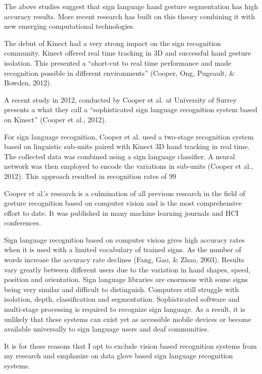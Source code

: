 The above studies suggest that sign language hand gesture segmentation has high accuracy results. More recent research has built on this theory combining it with new emerging computational technologies. 

The debut of Kinect had a very strong impact on the sign recognition community. Kinect offered real time tracking in 3D and successful hand gesture isolation. This presented a ``short-cut to real time performance and made recognition possible in different environments'' (Cooper, Ong, Pugeault, \& Bowden, 2012).

A recent study in 2012, conducted by Cooper et al. at University of Surrey presents a what they call a ``sophisticated sign language recognition system based on Kinect'' (Cooper et al., 2012).

For sign language recognition, Cooper et al. used a two-stage recognition system based on linguistic sub-units paired with Kinect 3D hand tracking in real time. The collected data was combined using a sign language classifier. A neural network was then employed to encode the variations in sub-units (Cooper et al., 2012). This approach resulted in recognition rates of 99%

Cooper et al.’s research is a culmination of all previous research in the field of gesture recognition based on computer vision and is the most comprehensive effort to date. It was published in many machine learning journals and HCI conferences. 

Sign language recognition based on computer vision gives high accuracy rates when it is used with a limited vocabulary of trained signs. As the number of words increase the accuracy rate declines (Fang, Gao, \& Zhao, 2003). Results vary greatly between different users due to the variation in hand shapes, speed, position and orientation. Sign language libraries are enormous with some signs being very similar and difficult to distinguish. Computers still struggle with isolation, depth, classification and segmentation. Sophisticated software and multi-stage processing is required to recognize sign language. As a result, it is unlikely that these systems can exist yet as accessible mobile devices or become available universally to sign language users and deaf communities. 

It is for these reasons that I opt to exclude vision based recognition systems from my research and emphasize on data glove based sign language recognition systems. 



